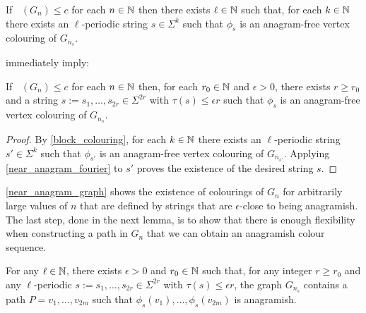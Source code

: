 \documentclass{patmorin}
\DeclareMathOperator{\afcn}{\dot{\chi}_\pi}
\begin{document}
\begin{lem}\label{block_colouring}
    If $\afcn(G_n)\le c$ for each $n\in\mathbb{N}$ then there exists $\ell\in\mathbb{N}$ such that, for each $k\in\mathbb{N}$ there exists an $\ell$-periodic string $s\in\Sigma^{k}$ such that $\phi_s$ is an anagram-free vertex colouring of $G_{n_s}$.
\end{lem}

 immediately imply:

\begin{lem}\label{near_anagram_graph}
    If $\afcn(G_n)\le c$ for each $n\in\mathbb{N}$ then, for each $r_0\in\mathbb{N}$ and $\epsilon>0$, there exists $r\ge r_0$ and a string $s:=s_1,\ldots,s_{2r}\in\Sigma^{2r}$ with $\tau(s)\le\epsilon r$ such that $\phi_s$ is an anagram-free vertex colouring of $G_{n_s}$.
\end{lem}

\begin{proof}
    By \cref{block_colouring}, for each $k\in\mathbb{N}$ there exists an $\ell$-periodic string $s'\in\Sigma^k$ such that $\phi_{s'}$ is an anagram-free vertex colouring of $G_{n_{s'}}$. Applying \cref{near_anagram_fourier} to $s'$ proves the existence of the desired string $s$.
\end{proof}

\cref{near_anagram_graph} shows the existence of colourings of $G_n$ for arbitrarily large values of $n$ that are defined by strings that are $\epsilon$-close to being anagramish.  The last step, done in the next lemma, is to show that there is enough flexibility when constructing a path in $G_n$ that we can obtain an anagramish colour sequence.

\begin{lem}\label{anagramish_path}
    For any $\ell\in\mathbb{N}$, there exists $\epsilon>0$ and $r_0\in\mathbb{N}$ such that, for any integer $r\ge r_0$ and any $\ell$-periodic $s:=s_1,\ldots,s_{2r}\in\Sigma^{2r}$ with $\tau(s)\le\epsilon r$, the graph $G_{n_s}$ contains a path $P=v_1,\ldots,v_{2m}$ such that $\phi_s(v_1),\ldots,\phi_s(v_{2m})$ is anagramish.
\end{lem}
\end{document}
